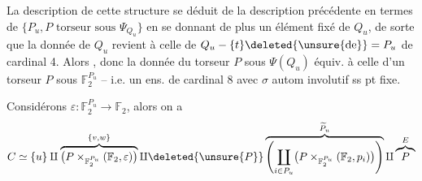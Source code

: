 La description de cette structure se déduit de la description précédente en termes de $\{P_u,P\text{ torseur sous }\Psi_{Q_u}\}$ en se donnant de plus un élément fixé  de $Q_u$, de sorte que la donnée de $Q_u$  revient à celle de $Q_u-\{t\}\deleted{\unsure{\mathrm{de}}}=P_u$ de cardinal 4. Alors
, donc la donnée du torseur $P$ sous $\Psi(Q_u)$ équiv. à celle d'un torseur $P$ sous $\mathbb F_2^{P_u}$ -- i.e.  un ens.  de cardinal 8 avec $\sigma$ autom involutif ss pt fixe.

  Considérons $\varepsilon:\mathbb F_2^{P_u}\longrightarrow\mathbb F_2$, alors on a
\[
C\simeq\{u\}\amalg\overbrace{\bigl(P\times_{\mathbb F_2^{P_u}}(\mathbb F_2,\varepsilon)\bigr)}^{\{v,w\}}
\amalg\deleted{\unsure{P}}\overbrace{\left(\coprod_{i\in P_u}\bigl(P\times_{\mathbb F_2^{P_u}}(\mathbb F_{2},p_i)\bigr)\right)}^{\widetilde P_u}
\amalg\overbrace{P}^{E}
\]
